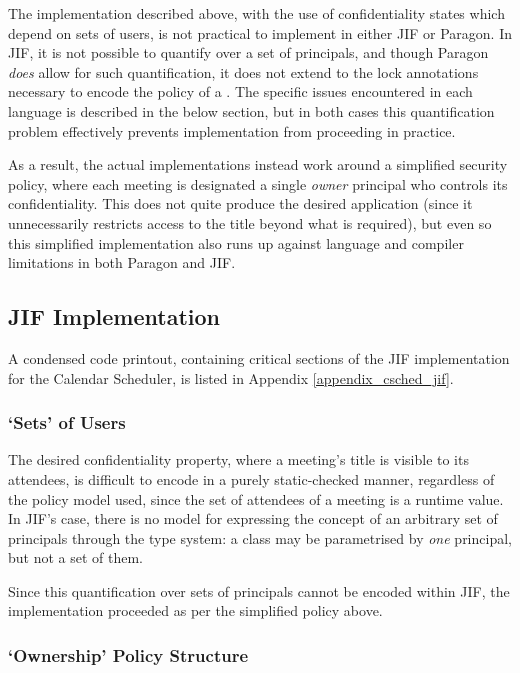 The implementation described above, with the use of confidentiality states which depend on sets of users, is not practical to implement in either JIF or Paragon. In JIF, it is not possible to quantify over a set of principals, and though Paragon \textit{does} allow for such quantification, it does not extend to the lock annotations necessary to encode the policy of a . The specific issues encountered in each language is described in the below section, but in both cases this quantification problem effectively prevents implementation from proceeding in practice.

As a result, the actual implementations instead work around a simplified security policy, where each meeting is designated a single \textit{owner} principal who controls its confidentiality. This does not quite produce the desired application (since it unnecessarily restricts access to the title beyond what is required), but even so this simplified implementation also runs up against language and compiler limitations in both Paragon and JIF.

\subsection{JIF Implementation}

A condensed code printout, containing critical sections of the JIF implementation for the Calendar Scheduler, is listed in Appendix \ref{appendix_csched_jif}.

\subsubsection{`Sets' of Users}

The desired confidentiality property, where a meeting's title is visible to its attendees, is difficult to encode in a purely static-checked manner, regardless of the policy model used, since the set of attendees of a meeting is a runtime value. In JIF's case, there is no model for expressing the concept of an arbitrary set of principals through the type system: a class may be parametrised by \textit{one} principal, but not a set of them.

Since this quantification over sets of principals cannot be encoded within JIF, the implementation proceeded as per the simplified policy above.

\subsubsection{`Ownership' Policy Structure}

